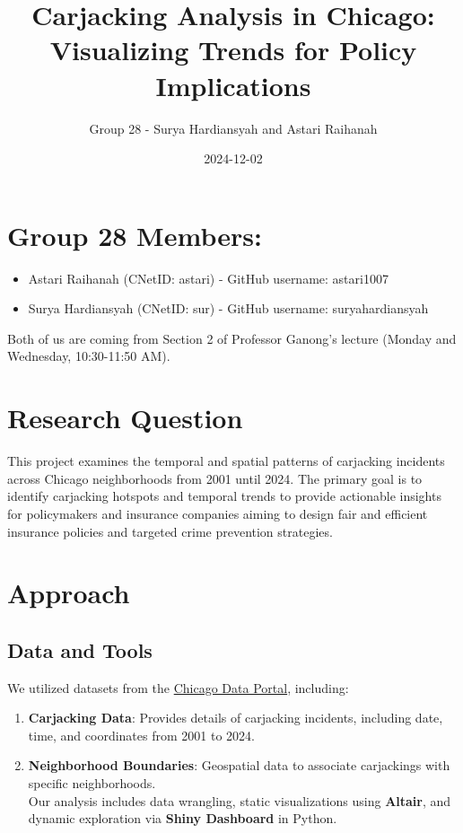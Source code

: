 \documentclass[
  9pt,
  letterpaper,
  DIV=11,
  numbers=noendperiod]{scrartcl}
\title{Carjacking Analysis in Chicago: Visualizing Trends for Policy
Implications}
\author{Group 28 - Surya Hardiansyah and Astari Raihanah}
\date{2024-12-02}
\providecommand{\tightlist}{%
  \setlength{\itemsep}{0pt}\setlength{\parskip}{0pt}}\usepackage{longtable,booktabs,array}
\begin{document}
\maketitle


\section{Group 28 Members:}\label{group-28-members}

\begin{itemize}
\tightlist
\item
  Astari Raihanah (CNetID: astari) - GitHub username: astari1007
\item
  Surya Hardiansyah (CNetID: sur) - GitHub username: suryahardiansyah
\end{itemize}

Both of us are coming from Section 2 of Professor Ganong's lecture
(Monday and Wednesday, 10:30-11:50 AM).

\section{Research Question}\label{research-question}

This project examines the temporal and spatial patterns of carjacking
incidents across Chicago neighborhoods from 2001 until 2024. The primary
goal is to identify carjacking hotspots and temporal trends to provide
actionable insights for policymakers and insurance companies aiming to
design fair and efficient insurance policies and targeted crime
prevention strategies.

\section{Approach}\label{approach}

\subsection{Data and Tools}\label{data-and-tools}

We utilized datasets from the
\href{https://data.cityofchicago.org}{Chicago Data Portal}, including:

\begin{enumerate}
\def\labelenumi{\arabic{enumi}.}
\tightlist
\item
  \textbf{Carjacking Data}: Provides details of carjacking incidents,
  including date, time, and coordinates from 2001 to 2024.
\item
  \textbf{Neighborhood Boundaries}: Geospatial data to associate
  carjackings with specific neighborhoods.\\
  Our analysis includes data wrangling, static visualizations using
  \textbf{Altair}, and dynamic exploration via \textbf{Shiny Dashboard}
  in Python.
\end{enumerate}
\end{document}
